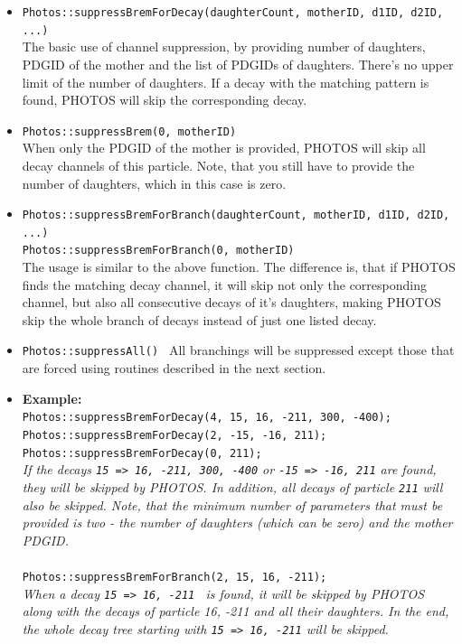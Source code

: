 \documentclass[]{Photos_interface_design}
\begin{document}
\begin{itemize}
 \item {\tt Photos::suppressBremForDecay(daughterCount, motherID, d1ID, d2ID, ...)} \hfill \\
       The basic use of channel suppression, by providing number of daughters,
	   PDGID of the mother and the list of PDGIDs of daughters.
	   There's no upper limit of the number of daughters.
	   If a decay with the matching pattern is found, PHOTOS will skip the corresponding decay.
 \item {\tt Photos::suppressBrem(0, motherID)} \hfill \\
       When only the PDGID of the mother is provided, PHOTOS will skip all decay channels
	   of this particle. Note, that you still have to provide the number of daughters,
	   which in this case is zero.
 \item {\tt Photos::suppressBremForBranch(daughterCount, motherID, d1ID, d2ID, ...)} \hfill \\
       {\tt Photos::suppressBremForBranch(0, motherID)} \hfill \\
       The usage is similar to the above function. The difference is,
	   that if PHOTOS finds the matching decay channel, it will skip not only the corresponding channel,
	   but also all consecutive decays of it's daughters, making PHOTOS skip the whole branch
	   of decays instead of just one listed decay.
 \item {\tt Photos::suppressAll() }
       All branchings will be suppressed except those that are forced using routines
	   described in the next section.
 \item \textbf{Example:} \hfill \\
{\tt Photos::suppressBremForDecay(4, 15, 16, -211, 300, -400); } \\
{\tt Photos::suppressBremForDecay(2, -15, -16, 211); } \\
{\tt Photos::suppressBremForDecay(0, 211); } \\
\emph{If the decays {\tt 15 => 16, -211, 300, -400} or {\tt -15 => -16, 211} are found, they will be skipped by PHOTOS. In addition, all decays of particle {\tt 211} will also be skipped. Note, that the minimum number of parameters that must be provided is two - the number of daughters (which can be zero) and the mother PDGID.} \\ \\
{\tt Photos::suppressBremForBranch(2, 15, 16, -211); } \\
\emph{When a decay {\tt 15 => 16, -211 } is found, it will be skipped by PHOTOS along with the decays of particle 16, -211 and all their daughters. In the end, the whole decay tree starting with {\tt 15 => 16, -211} will be skipped.}
\end{itemize}
\end{document}
